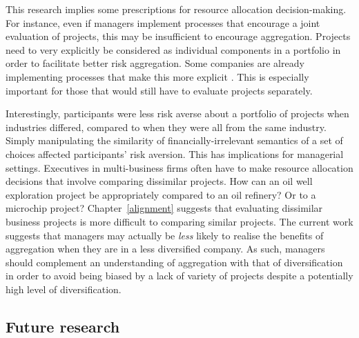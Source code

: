 \documentclass[a4paper, nobind, dvipsnames]{templates/ociamthesis}
\theoremstyle{definition}
\theoremstyle{definition}
\theoremstyle{definition}
\theoremstyle{definition}
\theoremstyle{remark}
\begin{document}
This research implies some prescriptions for resource allocation
decision-making. For instance, even if managers implement processes that
encourage a joint evaluation of projects, this may be insufficient to encourage
aggregation. Projects need to very explicitly be considered as individual
components in a portfolio in order to facilitate better risk aggregation. Some
companies are already implementing processes that make this more explicit
\autocite{lovallo2020}. This is especially important for those that would still have
to evaluate projects separately.

Interestingly, participants were less risk averse about a portfolio of projects
when industries differed, compared to when they were all from the same industry.
Simply manipulating the similarity of financially-irrelevant semantics of a set
of choices affected participants' risk aversion. This has implications for
managerial settings. Executives in multi-business firms often have to make
resource allocation decisions that involve comparing dissimilar projects. How
can an oil well exploration project be appropriately compared to an oil
refinery? Or to a microchip project? Chapter~\ref{alignment} suggests that
evaluating dissimilar business projects is more difficult to comparing similar
projects. The current work suggests that managers may actually be \emph{less} likely
to realise the benefits of aggregation when they are in a less diversified
company. As such, managers should complement an understanding of aggregation
with that of diversification in order to avoid being biased by a lack of variety
of projects despite a potentially high level of diversification.

\subsection{Future research}
\end{document}
